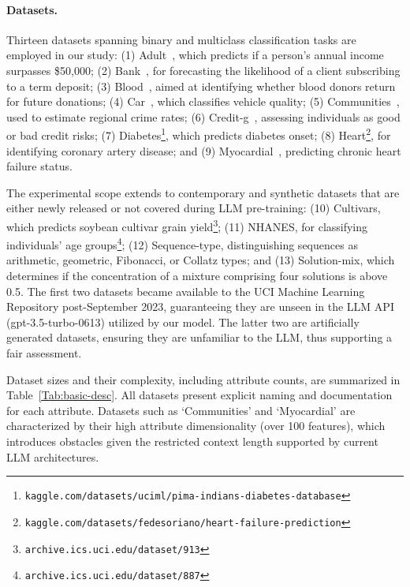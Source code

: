 \paragraph{Datasets.}
Thirteen datasets spanning binary and multiclass classification tasks are employed in our study: (1) Adult~\cite{asuncion2007uci}, which predicts if a person's annual income surpasses \$50,000; (2) Bank~\cite{moro2014data}, for forecasting the likelihood of a client subscribing to a term deposit; (3) Blood~\cite{yeh2009knowledge}, aimed at identifying whether blood donors return for future donations; (4) Car~\cite{kadra2021well}, which classifies vehicle quality; (5) Communities~\cite{misc_communities_and_crime_183}, used to estimate regional crime rates; (6) Credit-g~\cite{kadra2021well}, assessing individuals as good or bad credit risks; (7) Diabetes\footnote{\texttt{kaggle.com/datasets/uciml/pima-indians-diabetes-database}}, which predicts diabetes onset; (8) Heart\footnote{\texttt{kaggle.com/datasets/fedesoriano/heart-failure-prediction}}, for identifying coronary artery disease; and (9) Myocardial~\cite{misc_myocardial_infarction_complications_579}, predicting chronic heart failure status.

The experimental scope extends to contemporary and synthetic datasets that are either newly released or not covered during LLM pre-training: (10) Cultivars, which predicts soybean cultivar grain yield\footnote{\texttt{archive.ics.uci.edu/dataset/913}}; (11) NHANES, for classifying individuals’ age groups\footnote{\texttt{archive.ics.uci.edu/dataset/887}}; (12) Sequence-type, distinguishing sequences as arithmetic, geometric, Fibonacci, or Collatz types; and (13) Solution-mix, which determines if the concentration of a mixture comprising four solutions is above 0.5. The first two datasets became available to the UCI Machine Learning Repository post-September 2023, guaranteeing they are unseen in the LLM API (gpt-3.5-turbo-0613) utilized by our model. The latter two are artificially generated datasets, ensuring they are unfamiliar to the LLM, thus supporting a fair assessment.

Dataset sizes and their complexity, including attribute counts, are summarized in Table~\ref{Tab:basic-desc}. All datasets present explicit naming and documentation for each attribute. Datasets such as `Communities' and `Myocardial' are characterized by their high attribute dimensionality (over 100 features), which introduces obstacles given the restricted context length supported by current LLM architectures.

